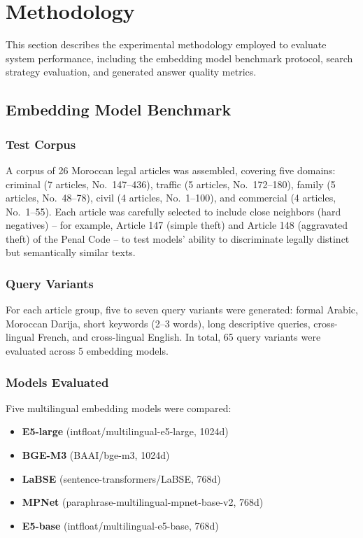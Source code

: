 \section{Methodology}

This section describes the experimental methodology employed to evaluate
system performance, including the embedding model benchmark protocol,
search strategy evaluation, and generated answer quality metrics.

\subsection{Embedding Model Benchmark}

\subsubsection{Test Corpus}

A corpus of 26 Moroccan legal articles was assembled, covering five domains:
criminal (7 articles, No.~147--436), traffic (5 articles, No.~172--180),
family (5 articles, No.~48--78), civil (4 articles, No.~1--100), and
commercial (4 articles, No.~1--55). Each article was carefully selected
to include close neighbors (hard negatives) -- for example, Article 147
(simple theft) and Article 148 (aggravated theft) of the Penal Code -- to
test models' ability to discriminate legally distinct but semantically
similar texts.

\subsubsection{Query Variants}

For each article group, five to seven query variants were generated:
formal Arabic, Moroccan Darija, short keywords (2--3 words), long
descriptive queries, cross-lingual French, and cross-lingual English.
In total, 65 query variants were evaluated across 5 embedding models.

\subsubsection{Models Evaluated}

Five multilingual embedding models were compared:

\begin{itemize}
    \item \textbf{E5-large} (intfloat/multilingual-e5-large, 1024d)
    \item \textbf{BGE-M3} (BAAI/bge-m3, 1024d)
    \item \textbf{LaBSE} (sentence-transformers/LaBSE, 768d)
    \item \textbf{MPNet} (paraphrase-multilingual-mpnet-base-v2, 768d)
    \item \textbf{E5-base} (intfloat/multilingual-e5-base, 768d)
\end{itemize}

